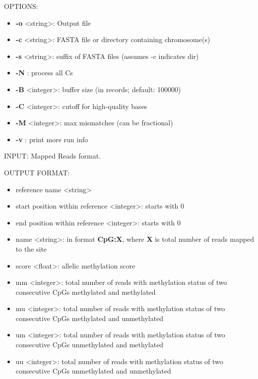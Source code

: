 \documentclass{article}
\begin{document}
OPTIONS:
\begin{itemize}
\item
\textbf{-o} \textless string\textgreater : Output file
\item
\textbf{-c} \textless string\textgreater : FASTA file or directory containing chromosome(s)
\item
\textbf{-s} \textless string\textgreater : suffix of FASTA files (assumes -c indicates dir)
\item
\textbf{-N} : process all Cs
\item
\textbf{-B} \textless integer\textgreater : buffer size (in records; default: 100000)
\item
\textbf{-C} \textless integer\textgreater : cutoff for high-quality bases
\item
\textbf{-M} \textless integer\textgreater : max mismatches (can be fractional)
\item
\textbf{-v} : print more run info
\end{itemize}

INPUT: Mapped Reads format.

OUTPUT FORMAT:
\begin{itemize}
\item
reference name \textless string\textgreater
\item
start position within reference \textless integer\textgreater: starts with 0
\item
end position within reference \textless integer\textgreater: starts with 0
\item
name \textless string\textgreater : in format \textbf{CpG:X}, where \textbf{X} is total number
of reads mapped to the site
\item
score \textless float\textgreater : allelic methylation score
\item
mm \textless integer\textgreater : total number of reads with methylation status of two consecutive CpGs methylated and methylated
\item
mu \textless integer\textgreater : total number of reads with methylation status of two consecutive CpGs methylated and unmethylated
\item
um \textless integer\textgreater : total number of reads with methylation status of two consecutive CpGs unmethylated and methylated
\item
uu \textless integer\textgreater : total number of reads with methylation status of two consecutive CpGs unmethylated and unmethylated
\end{itemize}
\end{document}
